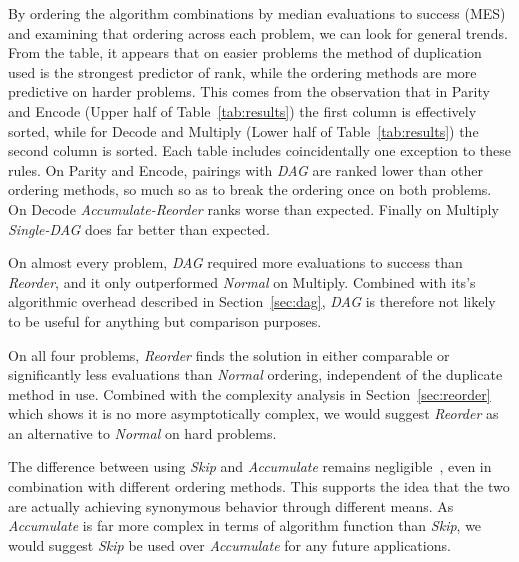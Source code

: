 \documentclass[journal]{IEEEtran}
\begin{document}
By ordering the algorithm combinations by median evaluations to success (MES) and examining that ordering across each
problem, we can look for general trends.  From the table, it appears that on easier problems
the method of duplication used is the strongest predictor of rank, while
the ordering methods are more predictive on harder problems.  This comes from the
observation that in Parity and Encode (Upper half of Table~\ref{tab:results})
the first column is effectively sorted, while for Decode and Multiply
(Lower half of Table~\ref{tab:results})
the second column is sorted.
Each table includes coincidentally one exception to these rules.  On Parity and
Encode, pairings with \emph{DAG} are ranked lower than other ordering methods, so much
so as to break the ordering once on both problems.  On Decode \emph{Accumulate-Reorder}
ranks worse than expected.  Finally on Multiply \emph{Single-DAG} does far better
than expected.

On almost every problem, \emph{DAG} required
more evaluations to success than \emph{Reorder}, and it only outperformed \emph{Normal}
on Multiply.  Combined with its's algorithmic overhead described in
Section~\ref{sec:dag}, \emph{DAG} is therefore not likely to be useful for anything
but comparison purposes.

On all four problems, \emph{Reorder} finds the solution in either comparable
or significantly less evaluations than \emph{Normal} ordering, independent of
the duplicate method in use.  Combined with the complexity analysis in
Section~\ref{sec:reorder} which shows it is no more asymptotically complex,
we would suggest \emph{Reorder} as an alternative to \emph{Normal} on hard
problems.

The difference between using \emph{Skip} and \emph{Accumulate} remains
negligible~\cite{goldman:2013:cgpwaste}, even in combination with different ordering
methods.
This supports the idea that the two are actually achieving synonymous behavior
through different means.
As \emph{Accumulate} is far more complex in terms of algorithm function
than \emph{Skip}, we would suggest \emph{Skip} be used over \emph{Accumulate} for
any future applications.
\end{document}
